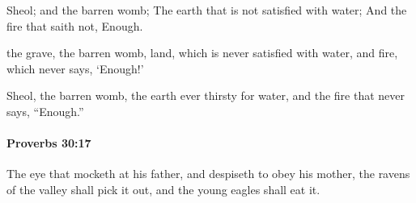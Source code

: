 			\begin{versebox}
					\item[BHS] 
					\item[ASV] Sheol; and the barren womb; The earth that is not satisfied with water; And the fire that saith not, Enough.
					\item[NIV] the grave, the barren womb, land, which is never satisfied with water, and fire, which never says, ‘Enough!’
					\item[NRSV] Sheol, the barren womb, the earth ever thirsty for water, and the fire that never says, “Enough.”
			\end{versebox}

		\paragraph{Proverbs 30:17} %
			\label{PROVERBS-30-17}

			The eye that mocketh at his father, and despiseth to obey his mother, the ravens of the valley shall pick it out, and the young eagles shall eat it.

